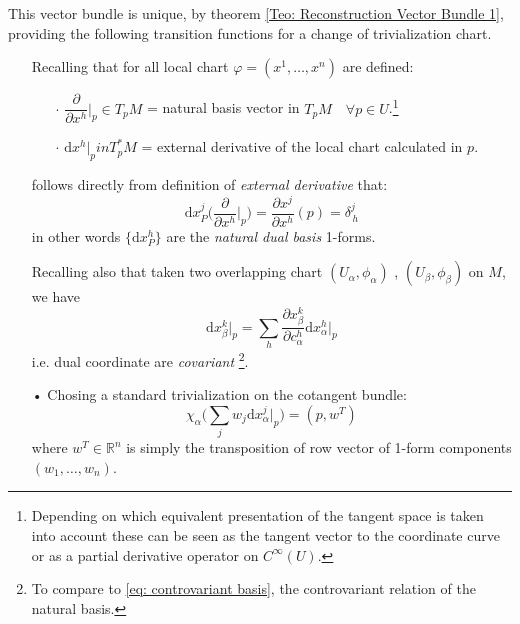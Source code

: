 \documentclass[a4paper,12pt]{scrartcl}    %
\begin{document}
\begin{observation}
This vector bundle is unique, by theorem \ref{Teo: Reconstruction Vector Bundle 1}, providing the following transition functions for a change of trivialization chart.
\begin{itemize}
\item[ ] Recalling that for all local chart $\varphi = (x^1, \ldots, x^n)$ are defined:
	\begin{itemize}
	\item[$\cdot$] $\dfrac{\partial}{\partial x^h} \big\vert_p \in T_p M$ = natural basis vector  in $T_p M \quad \forall p \in U$.\footnote{Depending on which equivalent presentation of the tangent space is taken into account these can be seen as the tangent vector to the coordinate curve or as a partial derivative operator on $C^\infty (U)$.}
	\item[$\cdot$] $\textrm{d}x^h \big \vert_p in T_p^*M$ = external derivative of the local chart calculated in $p$.
	\end{itemize}

	follows directly from definition of \emph{external derivative} that:
	\begin{displaymath}
	\textrm{d}x^j_P \big( \frac{\partial}{\partial x^h} \big \vert_p \big) = \frac{\partial x^j}{\partial x^h}(p) = \delta^j_{\, h}
	\end{displaymath}
	in other words $\{ \textrm{d}x^h_P \}$ are the \emph{natural dual basis} 1-forms.

\item[ ] Recalling also that taken two overlapping chart $(U_\alpha, \phi_\alpha)$ , $(U_\beta, \phi_\beta)$ on $M$, we have
	\begin{displaymath}
	\textrm{d}x^k_{\beta} \big \vert_p = \sum_h \frac{\partial x^k_{\beta}}{\partial c^h _\alpha}\textrm{d}x^h_\alpha \big \vert_p
	\end{displaymath}
	i.e. dual coordinate are \emph{covariant} \footnote{To compare to \eqref{eq: controvariant basis}, the controvariant relation of the natural basis.}.

\item[•] Chosing a standard trivialization on the cotangent bundle:
	\begin{displaymath}
	\chi_\alpha \big( \sum_j w_j \textrm{d}x^j_\alpha \big \vert_p \big) = (p, w^T)
	\end{displaymath}
	where $w^T \in \mathbb{R}^n$ is simply the transposition of row vector of 1-form components $( w_1, \ldots, w_n)$.	
	

\end{itemize}
\end{observation}
\end{document}
